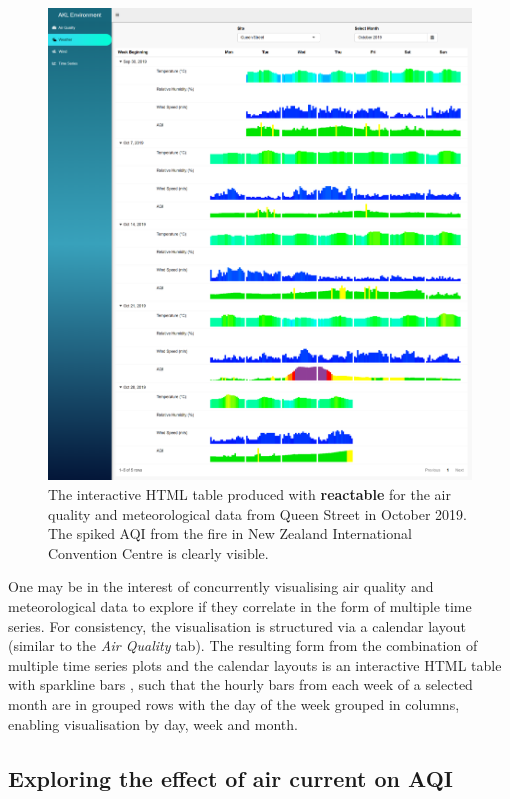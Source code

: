 \documentclass{aucklandthesis}
\begin{document}
\begin{figure}
\includegraphics[width=1\linewidth]{figures/met-tab} \caption{The interactive HTML table produced with \textbf{reactable} \autocite{reactable} for the air quality and meteorological data from Queen Street in October 2019. The spiked AQI from the fire in New Zealand International Convention Centre is clearly visible.}\label{fig:unnamed-chunk-4}
\end{figure}



One may be in the interest of concurrently visualising air quality and meteorological data to explore if they correlate in the form of multiple time series. For consistency, the visualisation is structured via a calendar layout (similar to the \emph{Air Quality} tab). The resulting form from the combination of multiple time series plots and the calendar layouts is an interactive HTML table with sparkline bars \autocite{sparkline}, such that the hourly bars from each week of a selected month are in grouped rows with the day of the week grouped in columns, enabling visualisation by day, week and month.

\hypertarget{exploring-the-effect-of-air-current-on-aqi}{%
\subsection{Exploring the effect of air current on AQI}\label{exploring-the-effect-of-air-current-on-aqi}}
\end{document}
